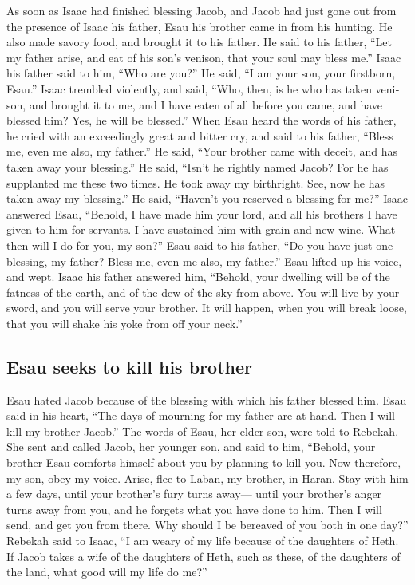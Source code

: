 \begin{paracol}{2}
\begin{otherlanguage}{english}
 As soon as Isaac had finished blessing Jacob, and Jacob
had just gone out from the presence of Isaac his father, Esau his
brother came in from his hunting.  He also made savory
food, and brought it to his father. He said to his father, ``Let my
father arise, and eat of his son's venison, that your soul may bless
me.''  Isaac his father said to him, ``Who are you?'' He
said, ``I am your son, your firstborn, Esau.''  Isaac
trembled violently, and said, ``Who, then, is he who has taken venison,
and brought it to me, and I have eaten of all before you came, and have
blessed him? Yes, he will be blessed.''  When Esau heard
the words of his father, he cried with an exceedingly great and bitter
cry, and said to his father, ``Bless me, even me also, my father.''
 He said, ``Your brother came with deceit, and has taken
away your blessing.''  He said, ``Isn't he rightly named
Jacob? For he has supplanted me these two times. He took away my
birthright. See, now he has taken away my blessing.'' He said, ``Haven't
you reserved a blessing for me?''  Isaac answered Esau,
``Behold, I have made him your lord, and all his brothers I have given
to him for servants. I have sustained him with grain and new wine. What
then will I do for you, my son?''  Esau said to his
father, ``Do you have just one blessing, my father? Bless me, even me
also, my father.'' Esau lifted up his voice, and wept. 
Isaac his father answered him, ``Behold, your dwelling will be of the
fatness of the earth, and of the dew of the sky from above.
 You will live by your sword, and you will serve your
brother. It will happen, when you will break loose, that you will shake
his yoke from off your neck.''

\hypertarget{esau-seeks-to-kill-his-brother}{%
\subsection{Esau seeks to kill his
brother}\label{esau-seeks-to-kill-his-brother}}

 Esau hated Jacob because of the blessing with which his
father blessed him. Esau said in his heart, ``The days of mourning for
my father are at hand. Then I will kill my brother Jacob.''
 The words of Esau, her elder son, were told to Rebekah.
She sent and called Jacob, her younger son, and said to him, ``Behold,
your brother Esau comforts himself about you by planning to kill you.
 Now therefore, my son, obey my voice. Arise, flee to
Laban, my brother, in Haran.  Stay with him a few days,
until your brother's fury turns away---  until your
brother's anger turns away from you, and he forgets what you have done
to him. Then I will send, and get you from there. Why should I be
bereaved of you both in one day?''  Rebekah said to
Isaac, ``I am weary of my life because of the daughters of Heth. If
Jacob takes a wife of the daughters of Heth, such as these, of the
daughters of the land, what good will my life do me?''


\end{otherlanguage}
\end{paracol}
